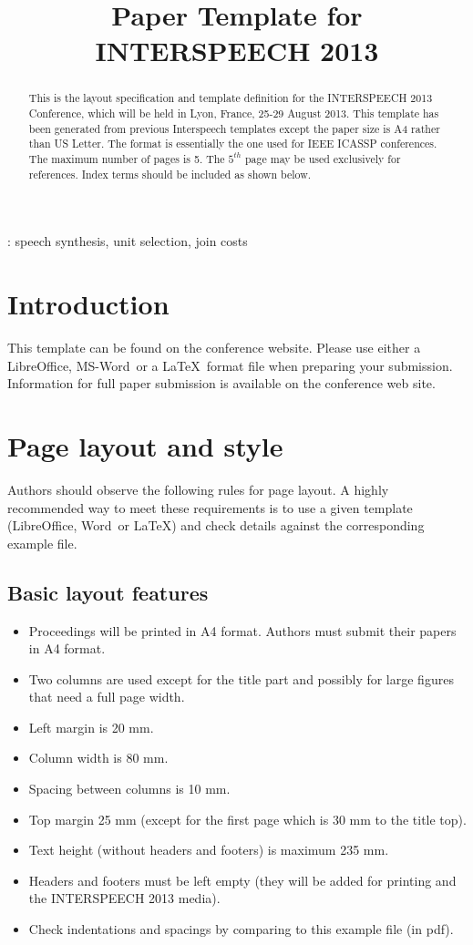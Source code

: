 \documentclass[a4paper]{article}
\title{Paper Template for INTERSPEECH 2013}
\def\reg{{\rm\ooalign{\hfil
     \raise.07ex\hbox{\scriptsize R}\hfil\crcr\mathhexbox20D}}}
\begin{document}
\maketitle
%
\begin{abstract}
This is the layout specification and template definition for the
INTERSPEECH 2013 Conference, which will be held in Lyon, France, 25-29
August 2013. This template has been generated from previous
Interspeech templates except the paper size is A4 rather than US
Letter. The format is essentially the one used for IEEE ICASSP
conferences. The maximum number of pages is 5. The $5^{th}$ page may be
used exclusively for references. Index terms should be included as shown below.
\end{abstract}
: speech synthesis, unit selection, join costs



%
\section{Introduction}

This template can be found on the conference website. Please use
either a LibreOffice, MS-Word\reg\ or a \LaTeX\ format file when preparing your
submission. Information for full paper submission is available on the
conference web site.

\section{Page layout and style}

Authors should observe the following rules for page layout. A
highly recommended way to meet these requirements is to use a given
template (LibreOffice, Word\reg\ or \LaTeX) and check details against the
corresponding example file.

\subsection{Basic layout features}

\begin{itemize}
\item Proceedings will be printed in A4 format. Authors must submit their papers
in A4 format.
\item Two columns are used except for the title part and possibly for large 
figures that need a full page width.
\item Left margin is 20 mm.
\item Column width is 80 mm.
\item Spacing between columns is 10 mm.
\item Top margin 25 mm (except for the first page which is 30 mm to the title top).
\item Text height (without headers and footers) is maximum 235 mm.
\item Headers and footers must be left empty (they will be added for 
printing and the INTERSPEECH 2013 media).
\item Check indentations and spacings by comparing to this 
example file (in pdf).
\end{itemize}
\end{document}
